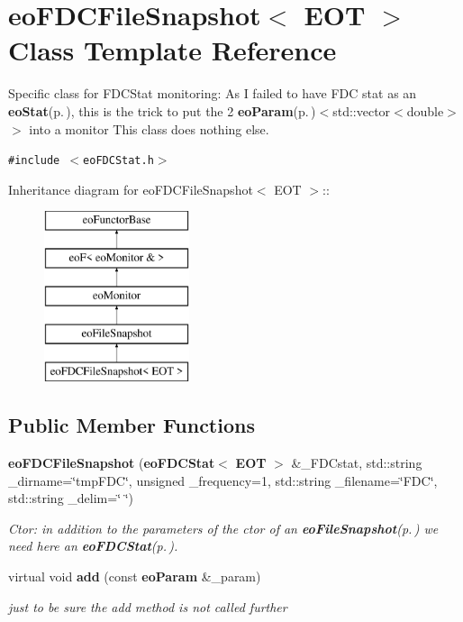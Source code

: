 \section{eo\-FDCFile\-Snapshot$<$ EOT $>$ Class Template Reference}
\label{classeo_f_d_c_file_snapshot}
Specific class for FDCStat monitoring: As I failed to have FDC stat as an {\bf eo\-Stat}{\rm (p.\,\pageref{classeo_stat})}, this is the trick to put the 2 {\bf eo\-Param}{\rm (p.\,\pageref{classeo_param})}$<$std::vector$<$double$>$ $>$ into a monitor This class does nothing else.  


{\tt \#include $<$eo\-FDCStat.h$>$}

Inheritance diagram for eo\-FDCFile\-Snapshot$<$ EOT $>$::\begin{figure}[H]
\begin{center}
\leavevmode
\includegraphics[height=5cm]{classeo_f_d_c_file_snapshot}
\end{center}
\end{figure}
\subsection*{Public Member Functions}
\begin{CompactItemize}
\item 
{\bf eo\-FDCFile\-Snapshot} ({\bf eo\-FDCStat}$<$ {\bf EOT} $>$ \&\_\-FDCstat, std::string \_\-dirname=\char`\"{}tmp\-FDC\char`\"{}, unsigned \_\-frequency=1, std::string \_\-filename=\char`\"{}FDC\char`\"{}, std::string \_\-delim=\char`\"{} \char`\"{})
\begin{CompactList}\small\item\em Ctor: in addition to the parameters of the ctor of an {\bf eo\-File\-Snapshot}{\rm (p.\,\pageref{classeo_file_snapshot})} we need here an {\bf eo\-FDCStat}{\rm (p.\,\pageref{classeo_f_d_c_stat})}. \item\end{CompactList}\item 
virtual void {\bf add} (const {\bf eo\-Param} \&\_\-param)\label{classeo_f_d_c_file_snapshot_a1}

\begin{CompactList}\small\item\em just to be sure the add method is not called further \item\end{CompactList}\end{CompactItemize}
